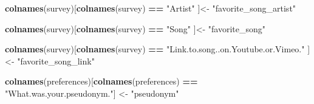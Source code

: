\documentclass[]{article}
\newenvironment{Shaded}{\begin{snugshade}}{\end{snugshade}}
\newcommand{\KeywordTok}[1]{\textcolor[rgb]{0.13,0.29,0.53}{\textbf{#1}}}
\newcommand{\NormalTok}[1]{#1}
\newcommand{\OperatorTok}[1]{\textcolor[rgb]{0.81,0.36,0.00}{\textbf{#1}}}
\newcommand{\StringTok}[1]{\textcolor[rgb]{0.31,0.60,0.02}{#1}}
\begin{document}
\begin{Shaded}
\begin{Highlighting}[]
\KeywordTok{colnames}\NormalTok{(survey)[}\KeywordTok{colnames}\NormalTok{(survey) }\OperatorTok{==}\StringTok{ "Artist"}\NormalTok{ ]<-}\StringTok{ "favorite_song_artist"}

\KeywordTok{colnames}\NormalTok{(survey)[}\KeywordTok{colnames}\NormalTok{(survey) }\OperatorTok{==}\StringTok{ "Song"}\NormalTok{ ]<-}\StringTok{ "favorite_song"}

\KeywordTok{colnames}\NormalTok{(survey)[}\KeywordTok{colnames}\NormalTok{(survey) }\OperatorTok{==}\StringTok{ "Link.to.song..on.Youtube.or.Vimeo."}\NormalTok{ ]<-}\StringTok{ "favorite_song_link"}

\KeywordTok{colnames}\NormalTok{(preferences)[}\KeywordTok{colnames}\NormalTok{(preferences) }\OperatorTok{==}\StringTok{ "What.was.your.pseudonym."}\NormalTok{] <-}\StringTok{ "pseudonym"}
\end{Highlighting}
\end{Shaded}
\end{document}
